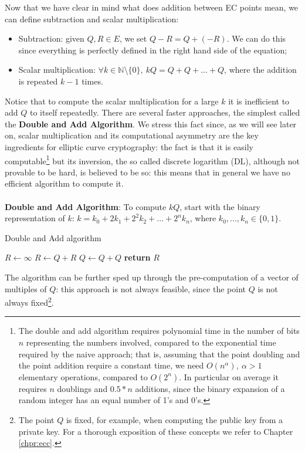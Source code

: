 \bigskip
\noindent
Now that we have clear in mind what does addition between EC points mean, we can define subtraction and scalar multiplication:
\begin{itemize}
	\item Subtraction: given $Q, R \in E$, we set $Q - R = Q + (-R)$. We can do this since everything is perfectly defined in the right hand side of the equation;
	\item Scalar multiplication: $\forall k \in \mathbb{N}$\textbackslash$\{0\}, \ kQ = Q + Q + ... + Q$, where the addition is repeated $k - 1$ times.
\end{itemize}
Notice that to compute the scalar multiplication for a large $k$ it is inefficient to add $Q$ to itself repeatedly. There are several faster approaches, the simplest called the {\bf Double and Add Algorithm}. 
We stress this fact since, as we will see later on, scalar multiplication and its computational asymmetry are the key ingredients for elliptic curve cryptography: the fact is that it is easily computable\footnote{The double and add algorithm requires polynomial time in the number of bits $n$ representing the numbers involved, compared to the exponential time required by the naive approach; that is, assuming that the point doubling and the point addition require a constant time, we need $O(n^{\alpha}), \ \alpha > 1$ elementary operations, compared to $O(2^n)$. In particular on average it requires $n$ doublings and $0.5 * n$  additions, since the binary expansion of a random integer has an equal number of 1's and 0's.}
but its inversion, the so called discrete logarithm (DL), although not provable to be hard, is believed to be so: this means that in general we have no efficient algorithm to compute it.
\\
\\
{\bf Double and Add Algorithm}: To compute $kQ$, start with the binary representation of $k$: $k = k_0 + 2k_1 + 2^2k_2 + ... + 2^nk_n$, where $k_0,...,k_n \in \{0, 1\}$. 

\begin{algorithm}
	\caption{Double and Add algorithm}
	\label{alg:double_add}
	\begin{algorithmic}[1]
		\State $R \gets \infty$
		\State $R \gets Q + R$
		\EndIf
		\State $Q \gets Q + Q$
		\EndFor
		\State \textbf{return} $R$
		\EndProcedure
	\end{algorithmic}
\end{algorithm}
\noindent
The algorithm can be further sped up through the pre-computation of a vector of multiples of $Q$: this approach is not always feasible, since the point $Q$ is not always fixed\footnote{The point $Q$ is fixed, for example, when computing the public key from a private key. For a thorough exposition of these concepts we refer to Chapter \ref{chpr:ecc}.}.